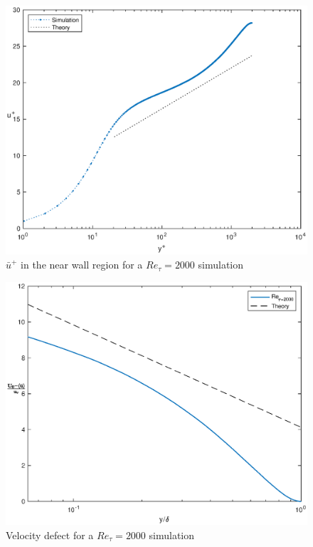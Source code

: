 \begin{figure}
\begin{center}
\includegraphics[scale=0.55]{grafici/loglaw_2000.eps}
\caption{$\bar{u}^{+}$ in the near wall region for a $Re_{\tau}=2000$ simulation}
\label{loglaw:2000}
\end{center} 
\end{figure}

\begin{figure}
\begin{center}
\includegraphics[scale=0.55]{grafici/velocity_defect_2000.eps}
\caption{Velocity defect for a $Re_{\tau}=2000$ simulation}
\label{velocity:defect:2000}
\end{center} 
\end{figure}

